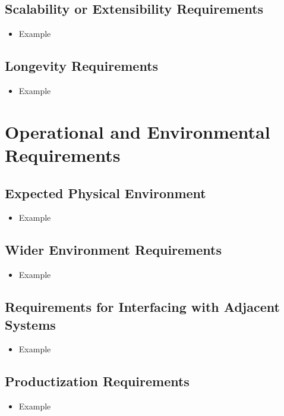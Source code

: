\documentclass[12pt]{article}
\begin{document}
  \subsection{Scalability or Extensibility Requirements}
    \begin{itemize}
      \item Example
    \end{itemize}

  \subsection{Longevity Requirements}
    \begin{itemize}
      \item Example
    \end{itemize}

\section{Operational and Environmental Requirements}
  \subsection{Expected Physical Environment}
  \begin{itemize}
    \item Example
  \end{itemize}

  \subsection{Wider Environment Requirements}
    \begin{itemize}
      \item Example
    \end{itemize}

  \subsection{Requirements for Interfacing with Adjacent Systems}
    \begin{itemize}
      \item Example
    \end{itemize}

  \subsection{Productization Requirements}
    \begin{itemize}
      \item Example
    \end{itemize}
\end{document}
